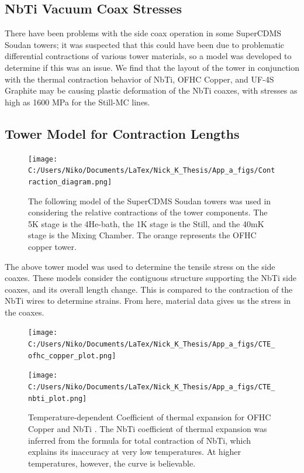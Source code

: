 \documentclass{report}
\begin{document}
\begin{appendices}

\chapter{NbTi Vacuum Coax Stresses}

There have been problems with the side coax operation in some SuperCDMS Soudan towers; it was suspected that this could have been due to problematic differential contractions of various tower materials, so a model was developed to determine if this was an issue. We find that the layout of the tower in conjunction with the thermal contraction behavior of NbTi, OFHC Copper, and UF-4S Graphite may be causing plastic deformation of the NbTi coaxes, with stresses as high as 1600 MPa for the Still-MC lines.

\section{Tower Model for Contraction Lengths}

\begin{figure}[h]
\texttt{[image: C:/Users/Niko/Documents/LaTex/Nick\_K\_Thesis/App\_a\_figs/Contraction\_diagram.png]}
\caption{The following model of the SuperCDMS Soudan towers was used in considering the relative contractions of the tower components. The 5K stage is the 4He-bath, the 1K stage is the Still, and the 40mK stage is the Mixing Chamber. The orange represents the OFHC copper tower.}
\end{figure}

The above tower model was used to determine the tensile stress on the side coaxes. These models consider the contiguous structure supporting the NbTi side coaxes, and its overall length change. This is compared to the contraction of the NbTi wires to determine strains. From here, material data gives us the stress in the coaxes.

\begin{figure}[h]
\centering
\begin{minipage}{.4\textwidth}
\texttt{[image: C:/Users/Niko/Documents/LaTex/Nick\_K\_Thesis/App\_a\_figs/CTE\_ofhc\_copper\_plot.png]}
\end{minipage}
\begin{minipage}{.4\textwidth}
\texttt{[image: C:/Users/Niko/Documents/LaTex/Nick\_K\_Thesis/App\_a\_figs/CTE\_nbti\_plot.png]}
\end{minipage}
\caption{Temperature-dependent Coefficient of thermal expansion for OFHC Copper \cite{ofhc_copper} and NbTi \cite{Marquardt2000}. The NbTi coefficient of thermal expansion was inferred from the formula for total contraction of NbTi, which explains its inaccuracy at very low temperatures. At higher temperatures, however, the curve is believable.}
\end{figure}


\end{appendices}
\end{document}
